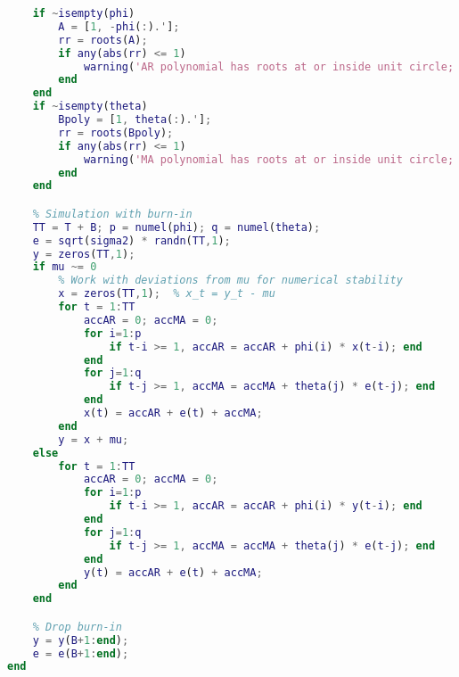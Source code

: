\documentclass[dvipsnames,11pt]{article}
\begin{document}
\begin{solution}
\begin{lstlisting}[language=Matlab]
    % Sanity: warn if (approx) nonstationary / noninvertible
    if ~isempty(phi)
        A = [1, -phi(:).'];
        rr = roots(A);
        if any(abs(rr) <= 1)
            warning('AR polynomial has roots at or inside unit circle; process may be nonstationary.');
        end
    end
    if ~isempty(theta)
        Bpoly = [1, theta(:).'];
        rr = roots(Bpoly);
        if any(abs(rr) <= 1)
            warning('MA polynomial has roots at or inside unit circle; process may be noninvertible.');
        end
    end

    % Simulation with burn-in
    TT = T + B; p = numel(phi); q = numel(theta);
    e = sqrt(sigma2) * randn(TT,1);
    y = zeros(TT,1);
    if mu ~= 0
        % Work with deviations from mu for numerical stability
        x = zeros(TT,1);  % x_t = y_t - mu
        for t = 1:TT
            accAR = 0; accMA = 0;
            for i=1:p
                if t-i >= 1, accAR = accAR + phi(i) * x(t-i); end
            end
            for j=1:q
                if t-j >= 1, accMA = accMA + theta(j) * e(t-j); end
            end
            x(t) = accAR + e(t) + accMA;
        end
        y = x + mu;
    else
        for t = 1:TT
            accAR = 0; accMA = 0;
            for i=1:p
                if t-i >= 1, accAR = accAR + phi(i) * y(t-i); end
            end
            for j=1:q
                if t-j >= 1, accMA = accMA + theta(j) * e(t-j); end
            end
            y(t) = accAR + e(t) + accMA;
        end
    end

    % Drop burn-in
    y = y(B+1:end);
    e = e(B+1:end);
end
\end{lstlisting}
        
    \end{solution}
\end{document}
